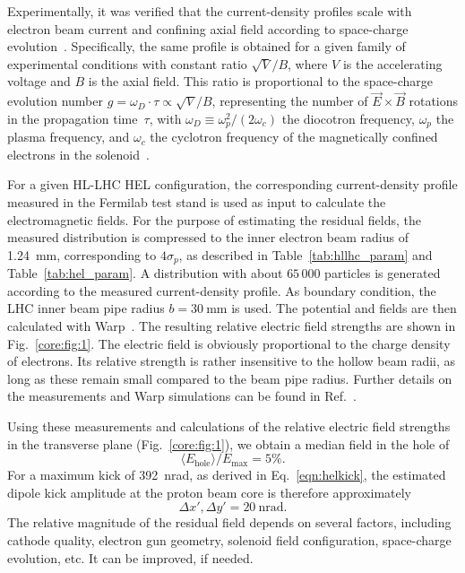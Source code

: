 \documentclass[%
 reprint,
 amsmath,amssymb,
 aps,
prstab,
longbibliography,
]{revtex4-1}
\newcommand{\q}[2]{\ensuremath{#1\ \mathrm{#2}}} %
\begin{document}
Experimentally, it was verified that the current-density profiles
scale with electron beam current and confining axial field according
to space-charge evolution~\cite{Jo:PoP:2018,
  hel_res_field_stancari_2017}. Specifically, the same profile is
obtained for a given family of experimental conditions with constant
ratio $\sqrt{V} / B$, where $V$ is the accelerating voltage and $B$ is
the axial field. This ratio is proportional to the space-charge
evolution number $g = \omega_D \cdot \tau \propto \sqrt{V}/B$,
representing the number of $\vec{E} \times \vec{B}$ rotations in the
propagation time~$\tau$, with
$\omega_D \equiv \omega_p^2 / (2 \omega_c)$ the diocotron frequency,
$\omega_p$ the plasma frequency, and $\omega_c$ the cyclotron
frequency of the magnetically confined electrons in the
solenoid~\cite{Davidson:nonneutral-plasmas:2001}.

For a given HL-LHC HEL configuration, the corresponding
current-density profile measured in the Fermilab test stand is used as
input to calculate the electromagnetic fields. For the purpose of
estimating the residual fields, the measured distribution is
compressed to the inner electron beam radius of 1.24~mm, corresponding
to $4\sigma_p$, as described in Table~\ref{tab:hllhc_param} and
Table~\ref{tab:hel_param}. A distribution with about $65\,000$
particles is generated according to the measured current-density
profile. As boundary condition, the LHC inner beam pipe radius
$b = \q{30}{mm}$ is used. The potential and fields are then calculated
with Warp~\cite{warp}. The resulting relative electric field strengths
are shown in Fig.~\ref{core:fig:1}. The electric field is obviously
proportional to the charge density of electrons. Its relative strength
is rather insensitive to the hollow beam radii, as long as these
remain small compared to the beam pipe radius. Further details on the
measurements and Warp simulations can be found in
Ref.~\cite{hel_res_field_stancari_2017}.

Using these measurements and calculations of the relative electric
field strengths in the transverse plane (Fig.~\ref{core:fig:1}), we
obtain a median field in the hole of
%
\begin{equation}
  \langle E_\mathrm{hole} \rangle / E_\mathrm{max} =  5\%.
\end{equation}
%
For a maximum kick of 392~nrad, as derived in Eq.~\ref{eqn:helkick},
the estimated dipole kick amplitude at the proton beam core is therefore
approximately
%
\begin{equation}
  \label{eqn:kick_central}
  \Delta x' , \Delta y' = \q{20}{nrad}.
\end{equation}
%
The relative magnitude of the residual field depends on several
factors, including cathode quality, electron gun geometry, solenoid
field configuration, space-charge evolution, etc. It can be improved,
if needed.
\end{document}
